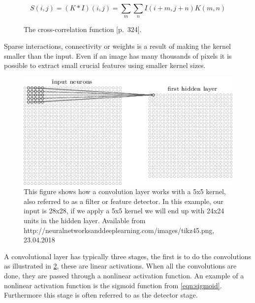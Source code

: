 \begin{figure}[H]
    \begin{equation}
        S(i,j) = (K*I)(i,j) = \sum_{m} \sum_{n} I(i+m,j+n)K(m,n)
    \end{equation}
    \label{fig:cross_corr}
    \caption{The cross-correlation function \cite{goodfellow_deep_2016}[p.~324].}
\end{figure}

Sparse interactions, connectivity or weights is a result of making the kernel smaller than the input. Even if an image has many thousands of pixels it is possible to extract small crucial features using smaller kernel sizes.

\begin{figure}[H]
    \centering
    \includegraphics[width=\textwidth]{Assets/Chapter2_Theory/kernel_applied.png}
    \caption{\cite{nielsen_neural_2015} This figure shows how a convolution layer works with a 5x5 kernel, also referred to as a filter or feature detector. In this example, our input is 28x28, if we apply a 5x5 kernel we will end up with 24x24 units in the hidden layer. Available from http://neuralnetworksanddeeplearning.com/images/tikz45.png, 23.04.2018}
    \label{fig:kernel_applied}
\end{figure}

A convolutional layer has typically three stages, the first is to do the convolutions as illustrated in \ref{fig:kernel_applied}, these are linear activations. When all the convolutions are done, they are passed through a nonlinear activation function. An example of a nonlinear activation function is the sigmoid function from \ref{eqn:sigmoid}. Furthermore this stage is often referred to as the detector stage.

